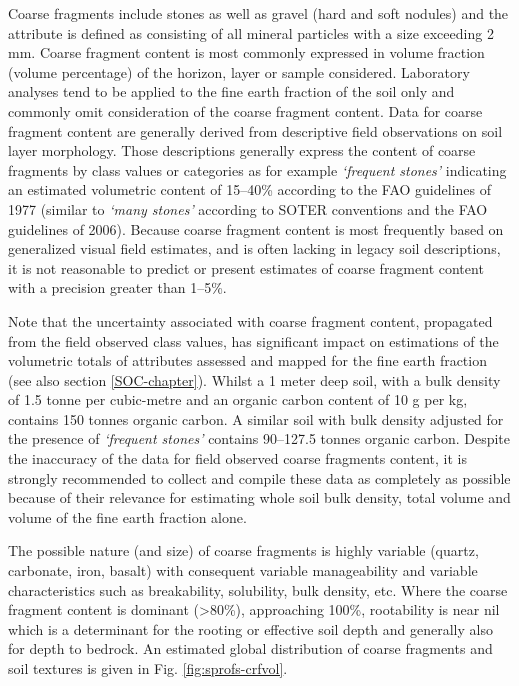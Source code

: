 \documentclass[11pt]{krantz}
\theoremstyle{definition}
\theoremstyle{definition}
\theoremstyle{definition}
\theoremstyle{remark}
\begin{document}
Coarse fragments include stones as well as gravel (hard and soft
nodules) and the attribute is defined as consisting of all mineral
particles with a size exceeding 2 mm. Coarse fragment content is most
commonly expressed in volume fraction (volume percentage) of the
horizon, layer or sample considered. Laboratory analyses tend to be
applied to the fine earth fraction of the soil only and commonly omit
consideration of the coarse fragment content. Data for coarse fragment
content are generally derived from descriptive field observations on
soil layer morphology. Those descriptions generally express the content
of coarse fragments by class values or categories as for example
\emph{`frequent stones'} indicating an estimated volumetric content of
15--40\% according to the FAO guidelines of 1977 (similar to \emph{`many
stones'} according to SOTER conventions and the FAO guidelines of 2006).
Because coarse fragment content is most frequently based on generalized
visual field estimates, and is often lacking in legacy soil
descriptions, it is not reasonable to predict or present estimates of
coarse fragment content with a precision greater than 1--5\%.

Note that the uncertainty associated with coarse fragment content,
propagated from the field observed class values, has significant impact
on estimations of the volumetric totals of attributes assessed and
mapped for the fine earth fraction (see also section \ref{SOC-chapter}).
Whilst a 1 meter deep soil, with a bulk density of 1.5 tonne per
cubic-metre and an organic carbon content of 10 g per kg, contains 150
tonnes organic carbon. A similar soil with bulk density adjusted for the
presence of \emph{`frequent stones'} contains 90--127.5 tonnes organic
carbon. Despite the inaccuracy of the data for field observed coarse
fragments content, it is strongly recommended to collect and compile
these data as completely as possible because of their relevance for
estimating whole soil bulk density, total volume and volume of the fine
earth fraction alone.

The possible nature (and size) of coarse fragments is highly variable
(quartz, carbonate, iron, basalt) with consequent variable manageability
and variable characteristics such as breakability, solubility, bulk
density, etc. Where the coarse fragment content is dominant
(\textgreater{}80\%), approaching 100\%, rootability is near nil which
is a determinant for the rooting or effective soil depth and generally
also for depth to bedrock. An estimated global distribution of coarse
fragments and soil textures is given in Fig. \ref{fig:sprofs-crfvol}.
\end{document}
